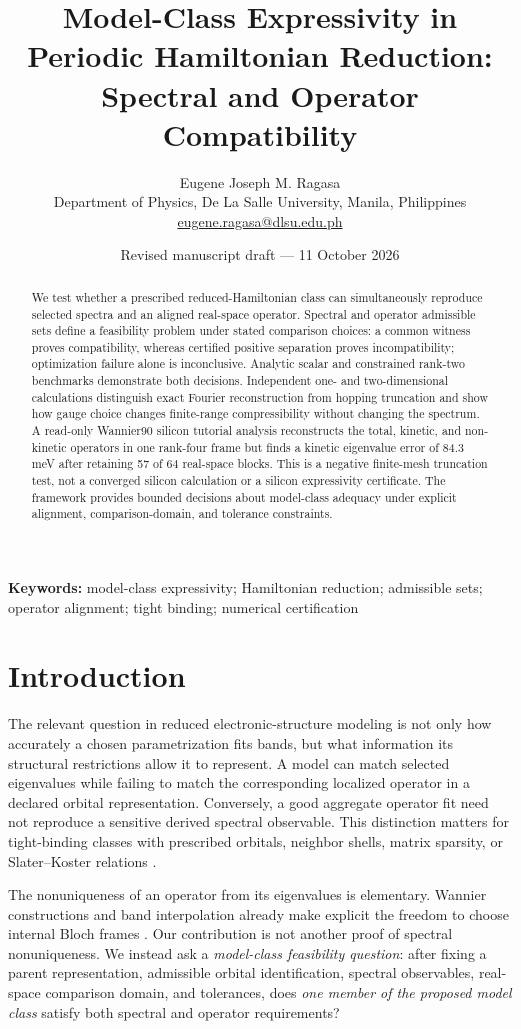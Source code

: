 \documentclass[11pt]{article}
\title{\textbf{Model-Class Expressivity in Periodic Hamiltonian Reduction:\\ Spectral and Operator Compatibility}\vspace{5pt}}
\author{Eugene Joseph M. Ragasa\\\small Department of Physics, De La Salle University, Manila, Philippines\\\small \href{mailto:eugene.ragasa@dlsu.edu.ph}{eugene.ragasa@dlsu.edu.ph}}
\date{Revised manuscript draft --- 11 October 2026}
\begin{document}
\maketitle
\begin{abstract}
We test whether a prescribed reduced-Hamiltonian class can simultaneously reproduce selected spectra and an aligned real-space operator. Spectral and operator admissible sets define a feasibility problem under stated comparison choices: a common witness proves compatibility, whereas certified positive separation proves incompatibility; optimization failure alone is inconclusive. Analytic scalar and constrained rank-two benchmarks demonstrate both decisions. Independent one- and two-dimensional calculations distinguish exact Fourier reconstruction from hopping truncation and show how gauge choice changes finite-range compressibility without changing the spectrum. A read-only Wannier90 silicon tutorial analysis reconstructs the total, kinetic, and non-kinetic operators in one rank-four frame but finds a kinetic eigenvalue error of 84.3 meV after retaining 57 of 64 real-space blocks. This is a negative finite-mesh truncation test, not a converged silicon calculation or a silicon expressivity certificate. The framework provides bounded decisions about model-class adequacy under explicit alignment, comparison-domain, and tolerance constraints.
\end{abstract}
\noindent\textbf{Keywords:} model-class expressivity; Hamiltonian reduction; admissible sets; operator alignment; tight binding; numerical certification

\section{Introduction}
The relevant question in reduced electronic-structure modeling is not only how accurately a chosen parametrization fits bands, but what information its structural restrictions allow it to represent. A model can match selected eigenvalues while failing to match the corresponding localized operator in a declared orbital representation. Conversely, a good aggregate operator fit need not reproduce a sensitive derived spectral observable. This distinction matters for tight-binding classes with prescribed orbitals, neighbor shells, matrix sparsity, or Slater--Koster relations \cite{slater1954,vogl1983}.

The nonuniqueness of an operator from its eigenvalues is elementary. Wannier constructions and band interpolation already make explicit the freedom to choose internal Bloch frames \cite{marzari2012,souza2001,pizzi2020,yates2007,marzari1997}. Our contribution is not another proof of spectral nonuniqueness. We instead ask a \emph{model-class feasibility question}: after fixing a parent representation, admissible orbital identification, spectral observables, real-space comparison domain, and tolerances, does \emph{one member of the proposed model class} satisfy both spectral and operator requirements?
\end{document}
